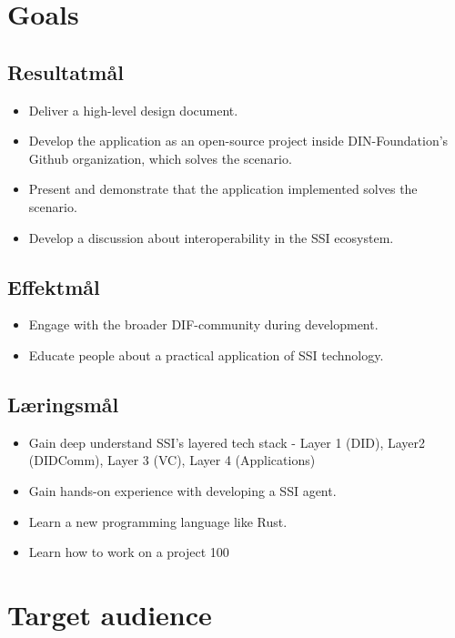 \section{Goals}

\subsection{Resultatmål}

\begin{itemize}
\item Deliver a high-level design document.
\item Develop the application as an open-source project inside DIN-Foundation's Github organization, which solves the scenario.
\item Present and demonstrate that the application implemented solves the scenario.
\item Develop a discussion about interoperability in the SSI ecosystem.
\end{itemize}

\subsection{Effektmål}

\begin{itemize}
\item Engage with the broader DIF-community during development.
\item Educate people about a practical application of SSI technology.
\end{itemize}

\subsection{Læringsmål}

\begin{itemize}
\item Gain deep understand SSI's layered tech stack - Layer 1 (DID), Layer2 (DIDComm), Layer 3 (VC), Layer 4 (Applications)
\item Gain hands-on experience with developing a SSI agent.
\item Learn a new programming language like Rust.
\item Learn how to work on a project 100%
\end{itemize}



\section{Target audience}


